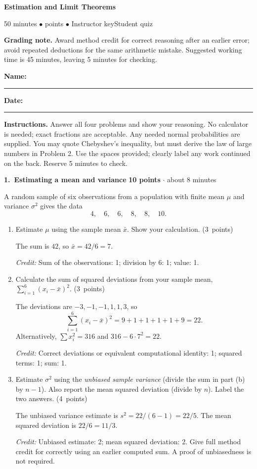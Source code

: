 \documentclass[11pt,letterpaper]{article}
\newcommand{\edition}{\ifanswers Instructor key\else Student quiz\fi}
\newcommand{\partpts}[1]{\unskip\nobreak\hspace{.3em}%
  \mbox{\small\color{muted}(#1 points)}}
\newcommand{\credit}[1]{\par{\footnotesize\color{muted}\textit{Credit:} #1}}
\newcommand{\problem}[4]{\par\addvspace{8pt}%
  {\large\bfseries\color{indigo}#1.\ #2}\hfill
  {\small\color{muted}\textbf{#3 points} $\cdot$ about #4 minutes}\par\nobreak}
\begin{document}
{\LARGE\bfseries\color{indigo}Estimation and Limit Theorems}\par
{\small\color{muted}50 minutes \quad $\bullet$  points
  \quad $\bullet$ \quad \edition}\par
\ifanswers
  \textbf{Grading note.} Award method credit for correct reasoning after an
  earlier error; avoid repeated deductions for the same arithmetic mistake.
  Suggested working time is 45 minutes, leaving 5 minutes for checking.\par
\else
  \smallskip
  \textbf{Name:}\ \rule{.49\linewidth}{.4pt}\hfill
  \textbf{Date:}\ \rule{.20\linewidth}{.4pt}\par
\fi
\textbf{Instructions.} Answer all four problems and show your reasoning.
No calculator is needed; exact fractions are acceptable. Any needed normal
probabilities are supplied. You may quote Chebyshev's inequality, but must
derive the law of large numbers in Problem 2. Use the spaces provided;
clearly label any work continued on the back. Reserve 5 minutes to check.

\problem{1}{Estimating a mean and variance}{10}{8}
A random sample of six observations from a population with finite mean
$\mu$ and variance $\sigma^2$ gives the data
\[
  4,\quad 6,\quad 6,\quad 8,\quad 8,\quad 10.
\]
\begin{enumerate}
  \item Estimate $\mu$ using the sample mean $\bar x$. Show your
  calculation. \partpts{3}
  \begin{solution}[1.1in]
    The sum is $42$, so $\bar x=42/6=7$.
    \credit{Sum of the observations: 1; division by $6$: 1; value: 1.}
  \end{solution}

  \item Calculate the sum of squared deviations from your sample mean,
  $\sum_{i=1}^{6}(x_i-\bar x)^2$. \partpts{3}
  \begin{solution}[1.4in]
    The deviations are $-3,-1,-1,1,1,3$, so
    \[
      \sum_{i=1}^{6}(x_i-\bar x)^2=9+1+1+1+1+9=22.
    \]
    Alternatively, $\sum x_i^2=316$ and $316-6\cdot7^2=22$.
    \credit{Correct deviations or equivalent computational identity: 1;
    squared terms: 1; sum: 1.}
  \end{solution}

  \item Estimate $\sigma^2$ using the \emph{unbiased sample variance}
  (divide the sum in part (b) by $n-1$). Also report the mean squared
  deviation (divide by $n$). Label the two answers. \partpts{4}
  \begin{solution}[1.35in]
    The unbiased variance estimate is $s^2=22/(6-1)=22/5$.
    The mean squared deviation is $22/6=11/3$.
    \credit{Unbiased estimate: 2; mean squared deviation: 2.
    Give full method credit for correctly using an earlier computed sum.
    A proof of unbiasedness is not required.}
  \end{solution}
\end{enumerate}
\end{document}
